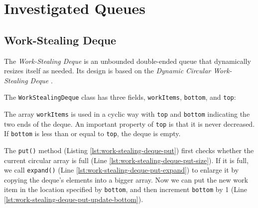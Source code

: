 
\chapter{Investigated Queues}
\label{chap:queues-implementation}


\section{Work-Stealing Deque}
\label{sec:queues-implementation-ws-deque}

The \emph{Work-Stealing Deque} is an unbounded double-ended queue that
dynamically resizes itself as needed. Its design is based on the
\emph{Dynamic Circular Work-Stealing Deque} \cite{Chase2005, Lev2005}.

The \lstinline!WorkStealingDeque! class has three fields,
\lstinline!workItems!, \lstinline!bottom!, and \lstinline!top!:



The array \lstinline!workItems! is used in a cyclic way with
\lstinline!top! and \lstinline!bottom! indicating the two ends of the
deque. An important property of \lstinline!top! is that it is never
decreased. If \lstinline!bottom! is less than or equal to
\lstinline!top!, the deque is empty.

The \lstinline!put()! method (Listing
\ref{lst:work-stealing-deque-put}) first checks whether the current
circular array is full (Line
\ref{lst:work-stealing-deque-put-size}). If it is full, we call
\lstinline!expand()! (Line \ref{lst:work-stealing-deque-put-expand})
to enlarge it by copying the deque's elements into a bigger array. Now
we can put the new work item in the location specified by
\lstinline!bottom!, and then increment \lstinline!bottom! by 1 (Line
\ref{lst:work-stealing-deque-put-update-bottom}).

